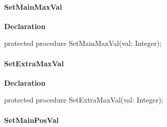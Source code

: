 \documentclass{report}
\newif\ifpdf
\begin{document}
\paragraph*{SetMainMaxVal}\hspace*{\fill}

\label{ipkhandle.TInstallation-SetMainMaxVal}
\begin{list}{}{
\setlength{\itemindent}{0cm}
\setlength{\listparindent}{0cm}
\setlength{\leftmargin}{\evensidemargin}
\addtolength{\leftmargin}{\tmplength}
\settowidth{\labelsep}{X}
\addtolength{\leftmargin}{\labelsep}
\setlength{\labelwidth}{\tmplength}
}
\item[\textbf{Declaration}\hfill]
\ifpdf
\begin{flushleft}
\fi
\begin{ttfamily}
protected procedure SetMainMaxVal(val: Integer);\end{ttfamily}

\ifpdf
\end{flushleft}
\fi

\end{list}
\paragraph*{SetExtraMaxVal}\hspace*{\fill}

\label{ipkhandle.TInstallation-SetExtraMaxVal}
\begin{list}{}{
\setlength{\itemindent}{0cm}
\setlength{\listparindent}{0cm}
\setlength{\leftmargin}{\evensidemargin}
\addtolength{\leftmargin}{\tmplength}
\settowidth{\labelsep}{X}
\addtolength{\leftmargin}{\labelsep}
\setlength{\labelwidth}{\tmplength}
}
\item[\textbf{Declaration}\hfill]
\ifpdf
\begin{flushleft}
\fi
\begin{ttfamily}
protected procedure SetExtraMaxVal(val: Integer);\end{ttfamily}

\ifpdf
\end{flushleft}
\fi

\end{list}
\paragraph*{SetMainPosVal}\hspace*{\fill}
\end{document}

